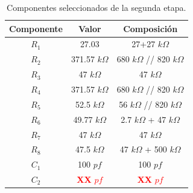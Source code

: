\begin{multicols}{2}
\begin{table}[H]
\centering
\begin{tabular}{ccc}
\hline
\multicolumn{1}{c}{Componente} & \multicolumn{1}{c}{Valor} & Composición  \\ \hline
$R_1$                           & 27.03                      & 27+27 $k\Omega$      \\
$R_2$                           & 371.57 $k\Omega$                    & 680 $k\Omega$ // 820 $k\Omega$ \\
$R_3$                           & 47 $k\Omega$                        & 47 $k\Omega$          \\
$R_4$                           & 371.57 $k\Omega$                    & 680 $k\Omega$ // 820 $k\Omega$   \\
$R_5$                           & 52.5 $k\Omega$                      & 56 $k\Omega$ // 820 $k\Omega$    \\
$R_6$                           & 49.77 $k\Omega$                     & 2.7 $k\Omega$ + 47 $k\Omega$     \\
$R_7$                           & 47 $k\Omega$                        & 47 $k\Omega$          \\
$R_8$                           & 47.5 $k\Omega$                        & 47 $k\Omega$ + 500 $k\Omega$          \\
$C_1$                           & 100 $pf$                       & 100 $pf$         \\
$C_2$ 							& \textcolor{red}{\textbf{XX} $pf$}                       & \textcolor{red}{\textbf{XX} $pf$}          \\
\hline
\end{tabular}
\caption{Componentes seleccionados de la segunda etapa.}
\end{table}
\end{multicols}

